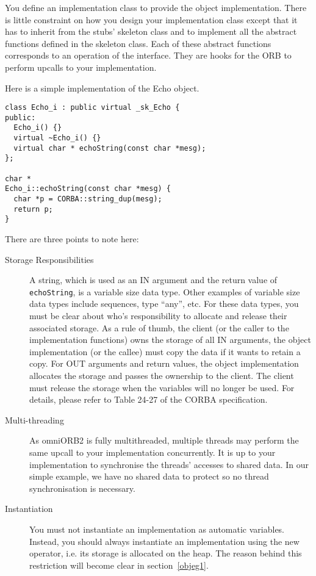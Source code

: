 \documentclass[11pt,twoside,onecolumn]{book}
\begin{document}
You define an implementation class to provide the object
implementation. There is little constraint on how you design your
implementation class except that it has to inherit from the stubs' skeleton
class and to implement all the abstract functions defined in the skeleton
class. Each of these abstract functions corresponds to an operation of the
interface. They are hooks for the ORB to perform upcalls to your
implementation.

Here is a simple implementation of the Echo object.

{\small
\begin{verbatim}
class Echo_i : public virtual _sk_Echo {
public:
  Echo_i() {}
  virtual ~Echo_i() {}
  virtual char * echoString(const char *mesg);
};

char *
Echo_i::echoString(const char *mesg) {
  char *p = CORBA::string_dup(mesg);
  return p;
}
\end{verbatim}
}

There are three points to note here:
\begin{description}
\item[Storage Responsibilities] A string, which is used as an IN argument
and the return value of {\tt echoString}, is a variable size data
type. Other examples of variable size data types include sequences, type
``any'', etc. For these data types, you must be clear about who's
responsibility to allocate and release their associated storage. As a rule
of thumb, the client (or the caller to the implementation functions) owns
the storage of all IN arguments, the object implementation (or the callee)
must copy the data if it wants to retain a copy. For OUT arguments and
return values, the object implementation allocates the storage and passes
the ownership to the client. The client must release the storage when the
variables will no longer be used.  For details, please refer to Table 24-27
of the CORBA specification.

\item[Multi-threading] As omniORB2 is fully multithreaded, multiple threads
may perform the same upcall to your implementation concurrently. It is up
to your implementation to synchronise the threads' accesses to shared data.
In our simple example, we have no shared data to protect so no
thread synchronisation is necessary.

\item[Instantiation] You must not instantiate an implementation as
automatic variables. Instead, you should always instantiate an
implementation using the new operator, i.e. its storage is allocated on the
heap. The reason behind this restriction will become clear in
section~\ref{objeg1}.

\end{description}
\end{document}
